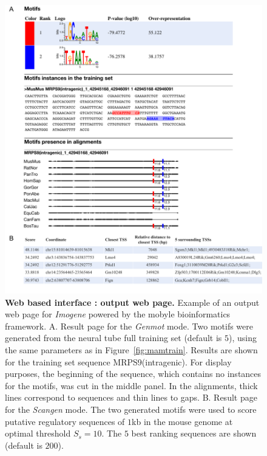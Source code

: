 \documentclass[a4,center,fleqn]{NAR}
\begin{document}
\clearpage
        \begin{figure}[!htbp]
\begin{center} 
\includegraphics[width=15cm]{figuresnar-sub/fig7.pdf}
\end{center}
\caption{ \normalsize
{\bf Web based interface : output web page.}
    Example of an output web page for {\em Imogene} powered by the mobyle
    bioinformatics framework.
    A. Result page for the {\em Genmot} mode.
    Two motifs were generated from the neural tube full training set (default
    is $5$), using the same parameters as in Figure~\ref{fig:mamtrain}.
    Results are shown for the training set sequence MRPS9(intragenic). For
    display purposes, the beginning of the sequence, which contains no
    instances for the motifs, was cut in the middle panel. In the
    alignments, thick lines correspond to sequences and thin lines to gaps.
    B. Result page for the {\em Scangen} mode.
    The two generated motifs were used to score putative regulatory sequences
    of $1$kb in the mouse genome at optimal threshold $S_s=10$.
    The $5$ best ranking sequences are shown (default is $200$).}
    \label{fig:interfaceout}
\end{figure}


\clearpage  
  
  
\end{document}
